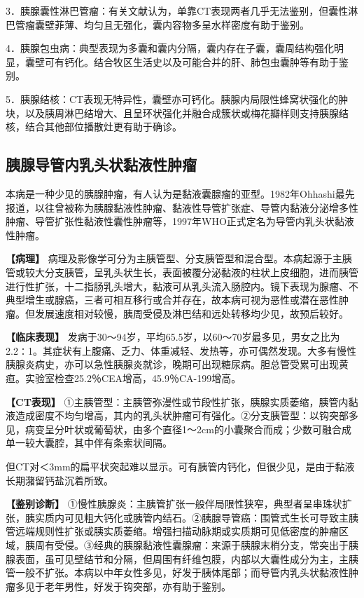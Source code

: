 3．胰腺囊性淋巴管瘤：有关文献认为，单靠CT表现两者几乎无法鉴别，但囊性淋巴管瘤囊壁菲薄、均匀且无强化，囊内容物多呈水样密度有助于鉴别。

4．胰腺包虫病：典型表现为多囊和囊内分隔，囊内存在子囊，囊周结构强化明显，囊壁可有钙化。结合牧区生活史以及可能合并的肝、肺包虫囊肿等有助于鉴别。

5．胰腺结核：CT表现无特异性，囊壁亦可钙化。胰腺内局限性蜂窝状强化的肿块，以及胰周淋巴结增大、且呈环状强化并融合成簇状或梅花瓣样则支持胰腺结核，结合其他部位播散灶更有助于确诊。

\subsection{胰腺导管内乳头状黏液性肿瘤}

本病是一种少见的胰腺肿瘤，有人认为是黏液囊腺瘤的亚型。1982年Ohhashi最先报道，以往曾被称为胰腺黏液性肿瘤、黏液性导管扩张症、导管内黏液分泌增多性肿瘤、导管扩张性黏液性囊性肿瘤等，1997年WHO正式定名为导管内乳头状黏液性肿瘤。

\textbf{【病理】}
病理及影像学可分为主胰管型、分支胰管型和混合型。本病起源于主胰管或较大分支胰管，呈乳头状生长，表面被覆分泌黏液的柱状上皮细胞，进而胰管进行性扩张，十二指肠乳头增大，黏液可从乳头流入肠腔内。镜下表现为腺瘤、不典型增生或腺癌，三者可相互移行或合并存在，故本病可视为恶性或潜在恶性肿瘤。但发展速度相对较慢，胰周受侵及淋巴结和远处转移均少见，故预后较好。

\textbf{【临床表现】}
发病于30～94岁，平均65.5岁，以60～70岁最多见，男女之比为2.2∶1。其症状有上腹痛、乏力、体重减轻、发热等，亦可偶然发现。大多有慢性胰腺炎病史，亦可以急性胰腺炎就诊，晚期可出现糖尿病。胆总管受累可出现黄疸。实验室检查25.2％CEA增高，45.9％CA-199增高。

\textbf{【CT表现】}
①主胰管型：主胰管弥漫性或节段性扩张，胰腺实质萎缩，胰管内黏液造成密度不均匀增高，其内的乳头状肿瘤可有强化。②分支胰管型：以钩突部多见，病变呈分叶状或葡萄状，由多个直径1～2cm的小囊聚合而成；少数可融合成单一较大囊腔，其中伴有条索状间隔。

但CT对＜3mm的扁平状突起难以显示。可有胰管内钙化，但很少见，是由于黏液长期潴留钙盐沉着所致。

\textbf{【鉴别诊断】}
①慢性胰腺炎：主胰管扩张一般伴局限性狭窄，典型者呈串珠状扩张，胰实质内可见粗大钙化或胰管内结石。②胰腺导管癌：围管式生长可导致主胰管远端规则性扩张或胰实质萎缩。增强扫描动脉期或实质期可见低密度的肿瘤区域，胰周有受侵。③经典的胰腺黏液性囊腺瘤：来源于胰腺末梢分支，常突出于胰腺表面，虽可见壁结节和分隔，但周围有纤维包膜，内部以大囊性成分为主，主胰管一般不扩张。本病以中年女性多见，好发于胰体尾部；而导管内乳头状黏液性肿瘤多见于老年男性，好发于钩突部，亦有助于鉴别。

